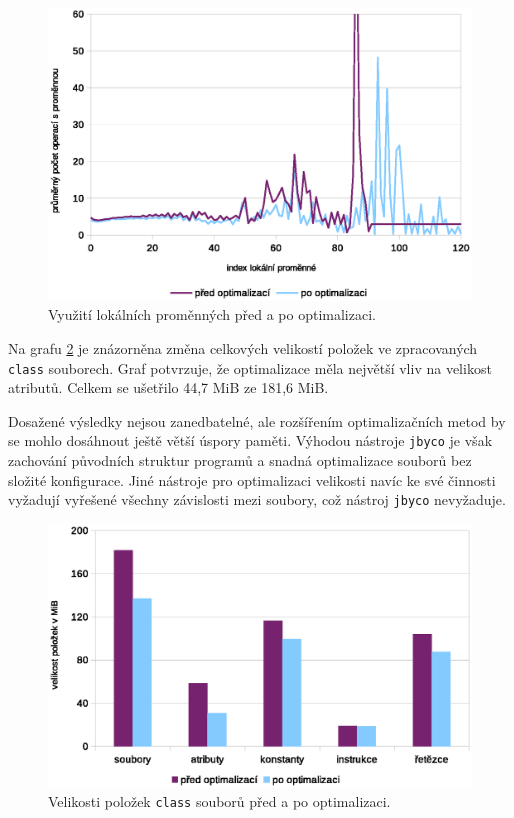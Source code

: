 \begin{figure}[h!]
\centering
\includegraphics[scale=0.9]{fig/locals_comparison}
\caption{Využití lokálních proměnných před a po optimalizaci.}\label{fig:cmp_locals}
\end{figure}

Na grafu \ref{fig:cmp_size} je znázorněna změna celkových velikostí položek ve zpracovaných \texttt{class} souborech. Graf potvrzuje, že optimalizace měla největší vliv na velikost atributů. Celkem se ušetřilo 44,7 MiB ze 181,6 MiB.

Dosažené výsledky nejsou zanedbatelné, ale rozšířením optimalizačních metod by se mohlo dosáhnout ještě větší úspory paměti. Výhodou nástroje \texttt{jbyco} je však zachování původních struktur programů a snadná optimalizace souborů bez složité konfigurace. Jiné nástroje pro optimalizaci velikosti \cite{ProGuard} navíc ke své činnosti vyžadují vyřešené všechny závislosti mezi soubory, což nástroj \texttt{jbyco} nevyžaduje.


\begin{figure}[h!]
\centering
\includegraphics[scale=0.9]{fig/size_comparison}
\caption{Velikosti položek \texttt{class} souborů před a po optimalizaci.}\label{fig:cmp_size}
\end{figure}


